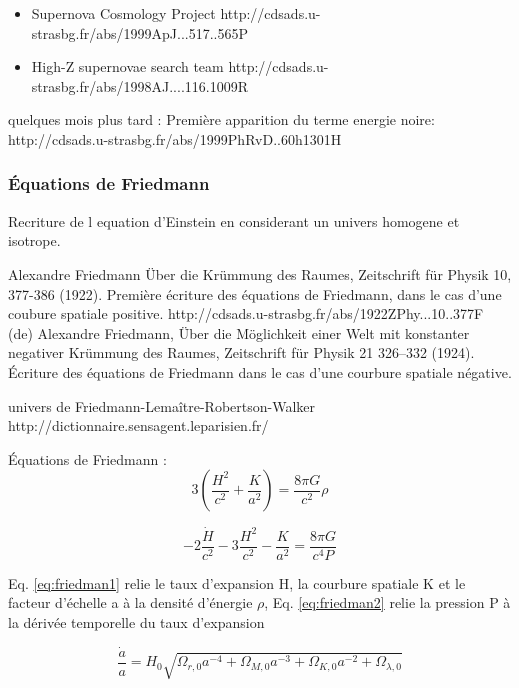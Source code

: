 \begin{itemize}
\item  Supernova Cosmology Project
 http://cdsads.u-strasbg.fr/abs/1999ApJ...517..565P
 
 \item  High-Z supernovae search team
http://cdsads.u-strasbg.fr/abs/1998AJ....116.1009R

\end{itemize}

quelques mois plus tard :
Première apparition du terme energie noire:
http://cdsads.u-strasbg.fr/abs/1999PhRvD..60h1301H



\subsubsection{ Équations de Friedmann }

 Recriture de l equation d'Einstein en considerant un univers homogene et isotrope.
 
 Alexandre Friedmann Über die Krümmung des Raumes, Zeitschrift für Physik 10, 377-386 (1922). Première écriture des équations de Friedmann, dans le cas d'une coubure spatiale positive. http://cdsads.u-strasbg.fr/abs/1922ZPhy...10..377F 
(de) Alexandre Friedmann, Über die Möglichkeit einer Welt mit konstanter negativer Krümmung des Raumes, Zeitschrift für Physik 21 326–332 (1924). Écriture des équations de Friedmann dans le cas d'une courbure spatiale négative. 
 
univers de Friedmann-Lemaître-Robertson-Walker  
http://dictionnaire.sensagent.leparisien.fr/%
 
Équations de Friedmann : 
\begin{equation}
3 \left( \frac{H^2}{c^2} +\frac{K}{a^2} \right) = \frac{8 \pi G }{c^2} \rho
\label{eq:friedman1}
\end{equation}

\begin{equation}
-2 \frac{ \dot{H}}{c^2} -3 \frac{H^2}{c^2} -\frac{K}{a^2} = \frac{8 \pi G }{c^4 P}
\label{eq:friedman2}
\end{equation}

Eq. \ref{eq:friedman1} relie le taux d'expansion H, la courbure spatiale K et le facteur d'échelle a à la densité d'énergie $\rho$, 
Eq. \ref{eq:friedman2} relie la pression P à la dérivée temporelle du taux d'expansion
 
 
 
\begin{equation}
\frac{\dot{a}}{a} = H_0 \sqrt{ \Omega_{r,0} a^{-4} +  \Omega_{M,0} a^{-3} + \Omega_{K,0}a^{-2} + \Omega_{\lambda,0}  } 
\end{equation}


